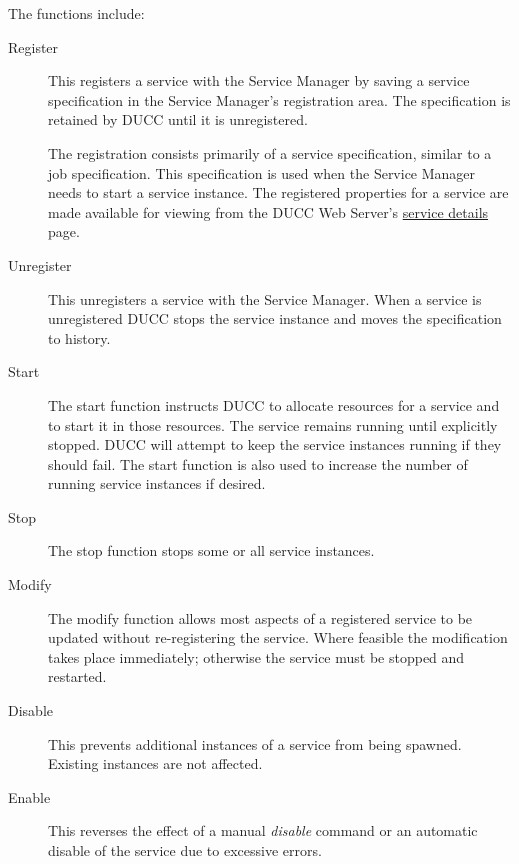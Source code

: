         The functions include: 
        \begin{description}
            \item[Register] This registers a service with the Service Manager by saving a service
              specification in the Service Manager's registration area. The specification is
              retained by DUCC until it is unregistered.

              The registration consists primarily of a service specification, similar
              to a job specification. This specification is
              used when the Service Manager needs to start a service instance.  
              The registered properties for a service are made available for
              viewing from the DUCC Web Server's \hyperref[sec:ws-service-details]{service details}
              page.
              
            \item[Unregister] This unregisters a service with the Service Manager. When a service is
              unregistered DUCC stops the service instance and moves the specification to history.
              
            \item[Start] The start function instructs DUCC to allocate resources for a service and to
              start it in those resources. The service remains running until explicitly stopped. DUCC
              will attempt to keep the service instances running if they should fail. The start function
              is also used to increase the number of running service instances if desired.
              
            \item[Stop] The stop function stops some or all service instances.
                            
            \item[Modify] The modify function allows most aspects of a registered service to be updated
              without re-registering the service.  Where feasible the modification takes place
              immediately; otherwise the service must be stopped and restarted.

            \item[Disable] This prevents additional instances of a service from being spawned.  Existing
              instances are not affected.  

            \item[Enable] This reverses the effect of a manual {\em disable} command or an automatic
              disable of the service due to excessive errors.


\end{description}
